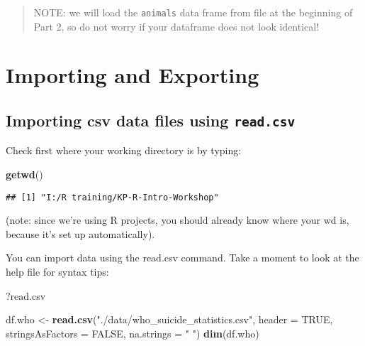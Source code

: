 \documentclass[]{article}
\newenvironment{Shaded}{\begin{snugshade}}{\end{snugshade}}
\newcommand{\KeywordTok}[1]{\textcolor[rgb]{0.13,0.29,0.53}{\textbf{#1}}}
\newcommand{\DataTypeTok}[1]{\textcolor[rgb]{0.13,0.29,0.53}{#1}}
\newcommand{\StringTok}[1]{\textcolor[rgb]{0.31,0.60,0.02}{#1}}
\newcommand{\OtherTok}[1]{\textcolor[rgb]{0.56,0.35,0.01}{#1}}
\newcommand{\NormalTok}[1]{#1}
\begin{document}
\begin{quote}
NOTE: we will load the \texttt{animals} data frame from file at the
beginning of Part 2, so do not worry if your dataframe does not look
identical!
\end{quote}

\section{Importing and Exporting}\label{importing-and-exporting}

\subsection{\texorpdfstring{Importing csv data files using
\texttt{read.csv}}{Importing csv data files using read.csv}}\label{importing-csv-data-files-using-read.csv}

Check first where your working directory is by typing:

\begin{Shaded}
\begin{Highlighting}[]
\KeywordTok{getwd}\NormalTok{()}
\end{Highlighting}
\end{Shaded}

\begin{verbatim}
## [1] "I:/R training/KP-R-Intro-Workshop"
\end{verbatim}

(note: since we're using R projects, you should already know where your
wd is, because it's set up automatically).

You can import data using the read.csv command. Take a moment to look at
the help file for syntax tips:

\begin{Shaded}
\begin{Highlighting}[]
\NormalTok{?read.csv}
\end{Highlighting}
\end{Shaded}

\begin{Shaded}
\begin{Highlighting}[]
\NormalTok{df.who <-}\StringTok{ }\KeywordTok{read.csv}\NormalTok{(}\StringTok{"./data/who_suicide_statistics.csv"}\NormalTok{, }
                    \DataTypeTok{header =} \OtherTok{TRUE}\NormalTok{, }
                    \DataTypeTok{stringsAsFactors =} \OtherTok{FALSE}\NormalTok{,}
                    \DataTypeTok{na.strings =} \StringTok{" "}\NormalTok{)}
\KeywordTok{dim}\NormalTok{(df.who)}
\end{Highlighting}
\end{Shaded}
\end{document}
